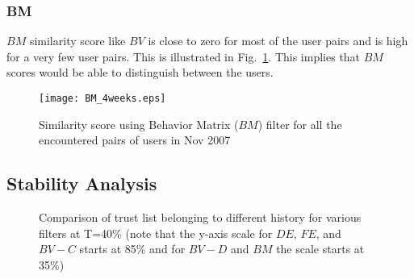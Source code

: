 \documentclass[10pt,conference]{IEEEtran}
\begin{document}
\subsubsection{BM}

$BM$ similarity score like $BV$ is close to zero for most of the user pairs and is high for a very few user pairs. This is illustrated in Fig.~\ref{fig:BM}. This implies that $BM$ scores would be able to distinguish between the users. 

\begin{figure}
\centering

\texttt{[image: BM\_4weeks.eps]} 
\caption{Similarity score using Behavior Matrix ($BM$) filter for all the encountered pairs of users in Nov 2007 }
\label{fig:BM}
\end{figure}





\subsection{Stability Analysis}

\begin{figure*}
  \begin{center}
\renewcommand{\thesubfigure}{\Alph{subfigure}.}

    \centering
    

    \caption{Comparison of trust list belonging to different history for various filters at T=40\% (note that the y-axis scale for $DE$, $FE$, and $BV-C$ starts at 85\% and for  $BV-D$ and $BM$ the scale starts at 35\%)}
    \label{fig:stability}
  \end{center}
\end{figure*}
\end{document}
